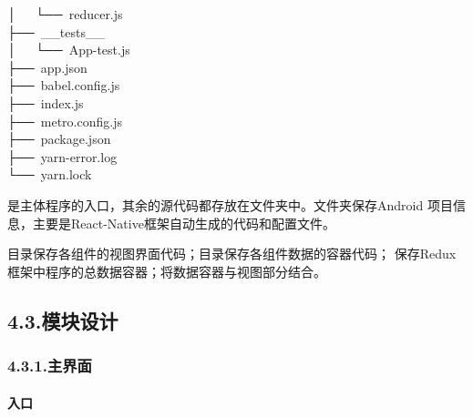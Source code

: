 \documentclass{article}
\begin{document}
\begin{mdpre}
│  ~└──~reducer.js\\
├──~\_\_tests\_\_\\
│~~~└──~App-test.js\\
├──~app.json\\
├──~babel.config.js\\
├──~index.js\\
├──~metro.config.js\\
├──~package.json\\
├──~yarn-error.log\\
└──~yarn.lock%
\end{mdpre}\noindent{}是主体程序的入口，其余的源代码都存放在文件夹中。文件夹保存Android
项目信息，主要是React-Native框架自动生成的代码和配置文件。

目录保存各组件的视图界面代码；目录保存各组件数据的容器代码；
保存Redux框架中程序的总数据容器；将数据容器与视图部分结合。%

\subsection{4.3.\hspace*{0.5em}模块设计}\label{section}%

\subsubsection{4.3.1.\hspace*{0.5em}主界面}\label{section}%

\paragraph{入口}\label{section}%
\end{document}
